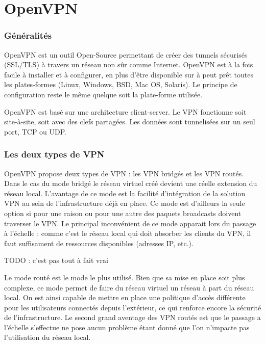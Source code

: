 \section{OpenVPN}

\subsubsection{Généralités}
OpenVPN est un outil Open-Source permettant de créer des tunnels sécurisés (SSL/TLS) à travers un réseau non sûr comme Internet. OpenVPN est à la fois facile à installer et à configurer, en plus d'être disponible sur à peut prêt toutes les plates-formes (Linux, Windows, BSD, Mac OS, Solaris). Le principe de configuration reste le même quelque soit la plate-forme utilisée.

OpenVPN est basé sur une architecture client-server. Le VPN fonctionne soit site-à-site, soit avec des clefs partagées. Les données sont tunnelisées sur un seul port, TCP ou UDP.

\subsubsection{Les deux types de VPN}
OpenVPN propose deux types de VPN : les VPN bridgés et les VPN routés. Dans le cas du mode bridgé le réseau virtuel créé devient une réelle extension du réseau local. L'avantage de ce mode est la facilité d'intégration de la solution VPN au sein de l'infrastructure déjà en place. Ce mode est d'ailleurs la seule option si pour une raison ou pour une autre des paquets broadcasts doivent traverser le VPN. Le principal inconvénient de ce mode apparait lors du passage à l'échelle : comme c'est le réseau local qui doit absorber les clients du VPN, il faut suffisament de ressources disponibles (adresses IP, etc.).

TODO : c'est pas tout à fait vrai

Le mode routé est le mode le plus utilisé. Bien que sa mise en place soit plus complexe, ce mode permet de faire du réseau virtuel un réseau à part du réseau local. On est ainsi capable de mettre en place une politique d'accès différente pour les utilisateurs connectés depuis l'extérieur, ce qui renforce encore la sécurité de l'infrastructure. Le second grand aventage des VPN routés est que le passage a l'échelle s'effectue ne pose aucun problème étant donné que l'on n'impacte pas l'utilisation du réseau local.

~

